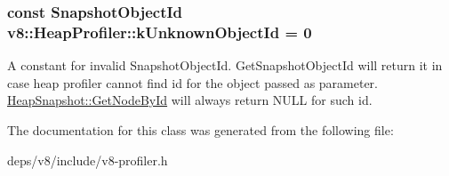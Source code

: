\subsubsection[{k\+Unknown\+Object\+Id}]{\setlength{\rightskip}{0pt plus 5cm}const Snapshot\+Object\+Id v8\+::\+Heap\+Profiler\+::k\+Unknown\+Object\+Id = 0\hspace{0.3cm}{\ttfamily [static]}}\label{classv8_1_1_heap_profiler_abf2b9d8facb18473f9b124ab8baf5786}
A constant for invalid Snapshot\+Object\+Id. Get\+Snapshot\+Object\+Id will return it in case heap profiler cannot find id for the object passed as parameter. \hyperlink{classv8_1_1_heap_snapshot_a023696f94fe538380922bf2c40c97b7b}{Heap\+Snapshot\+::\+Get\+Node\+By\+Id} will always return N\+U\+L\+L for such id. 

The documentation for this class was generated from the following file\+:\begin{DoxyCompactItemize}
\item 
deps/v8/include/v8-\/profiler.\+h\end{DoxyCompactItemize}
